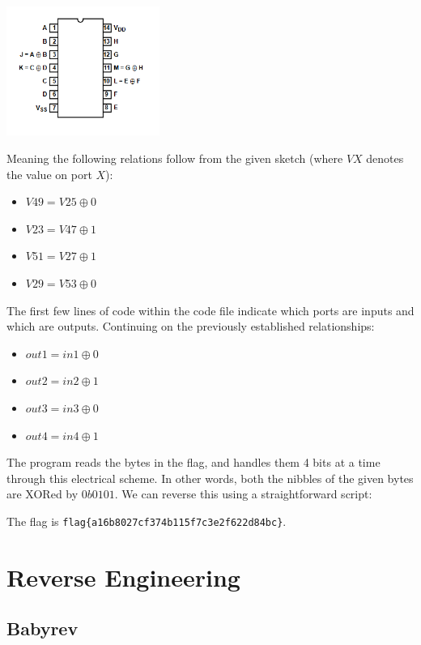 \documentclass{article}
\begin{document}
\begin{center}
    \includegraphics[width=5cm]{dweeno/datasheet-figure.png}
\end{center}

\noindent
Meaning the following relations follow from the given sketch (where $VX$ denotes the value on port $X$):

\begin{itemize}
    \item $V49 = V25 \oplus 0$
    \item $V23 = V47 \oplus 1$
    \item $V51 = V27 \oplus 1$
    \item $V29 = V53 \oplus 0$
\end{itemize}

\noindent
The first few lines of code within the code file indicate which ports are inputs and which are outputs. Continuing on the previously established relationships:

\begin{itemize}
    \item $out1 = in1 \oplus 0$
    \item $out2 = in2 \oplus 1$
    \item $out3 = in3 \oplus 0$
    \item $out4 = in4 \oplus 1$
\end{itemize}

\noindent
The program reads the bytes in the flag, and handles them 4 bits at a time through this electrical scheme. In other words, both the nibbles of the given bytes are XORed by $0b0101$. We can reverse this using a straightforward script:



\noindent
The flag is \texttt{flag\{a16b8027cf374b115f7c3e2f622d84bc\}}.
\section{Reverse Engineering}
\subsection{Babyrev}
\end{document}
